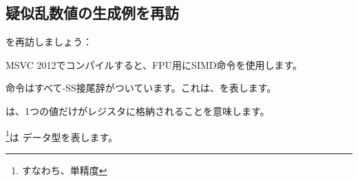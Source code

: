 ﻿\subsection{疑似乱数値の生成例を再訪}
\label{FPU_PRNG_SIMD}

を再訪しましょう：

MSVC 2012でコンパイルすると、FPU用にSIMD命令を使用します。




命令はすべて-SS接尾辞がついています。これは、を表します。

 は、1つの値だけがレジスタに格納されることを意味します。

\footnote{すなわち、単精度}は \Tfloat データ型を表します。
